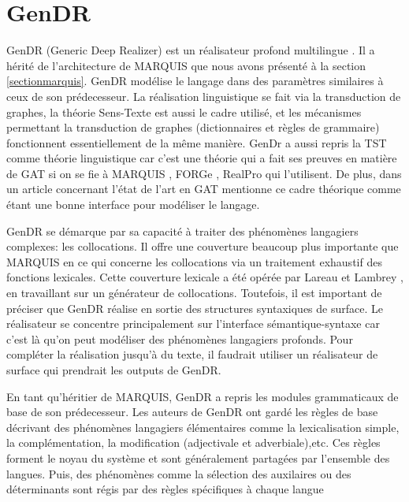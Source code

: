 
\chapter{GenDR}\label{chapgendr}

GenDR (Generic Deep Realizer) est un réalisateur profond multilingue \citep{lareau18}. Il a hérité de l'architecture de MARQUIS \cite{WannerMARQUISGENERATIONUSERTAILORED2010} que nous avons présenté à la section \ref{sectionmarquis}. GenDR modélise le langage dans des paramètres similaires à ceux de son prédecesseur. La réalisation linguistique se fait via la transduction de graphes, la théorie Sens-Texte est aussi le cadre utilisé, et les mécanismes permettant la transduction de graphes (dictionnaires et règles de grammaire) fonctionnent essentiellement de la même manière. GenDr a aussi repris la \ac{TST} comme théorie linguistique car c'est une théorie qui a fait ses preuves en matière de \ac{GAT} si on se fie à MARQUIS \citep{WannerMARQUISGENERATIONUSERTAILORED2010}, FORGe \citep{MilledemoFORGePompeu2017}, RealPro \citep{LavoieFastPortableRealizer1997} qui l'utilisent. De plus, \cite{Vicentegeneracionlenguajenatural2015} dans un article concernant l'état de l'art en \ac{GAT} mentionne ce cadre théorique comme étant une bonne interface pour modéliser le langage.

GenDR se démarque par sa capacité à traiter des phénomènes langagiers complexes: les collocations. Il offre une couverture beaucoup plus importante que MARQUIS en ce qui concerne les collocations via un traitement exhaustif des fonctions lexicales. Cette couverture lexicale a été opérée par Lareau et Lambrey \cite{LambreyImplementationcollocationspour2017}, \cite{lambrey15} en travaillant sur un générateur de collocations. Toutefois, il est important de préciser que GenDR réalise en sortie des structures syntaxiques de surface. Le réalisateur se concentre principalement sur l'interface sémantique-syntaxe car c'est là qu'on peut modéliser des phénomènes langagiers profonds. Pour compléter la réalisation jusqu'à du texte, il faudrait utiliser un réalisateur de surface qui prendrait les outputs de GenDR.

En tant qu'héritier de MARQUIS, GenDR a repris les modules grammaticaux de base de son prédecesseur. Les auteurs de GenDR ont gardé les règles de base décrivant des phénomènes langagiers élémentaires comme la  lexicalisation simple, la complémentation, la modification (adjectivale et adverbiale),etc. Ces règles forment le noyau du système et sont généralement partagées par l'ensemble des langues. Puis, des phénomènes comme la sélection des auxilaires ou des déterminants sont régis par des règles spécifiques à chaque langue

